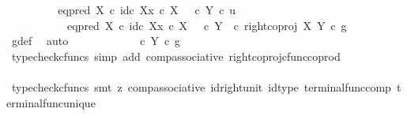\begin{isabellebody}
\ {\isacharminus}{\kern0pt}\isanewline
\ \ \ \ \ \ \isamarkupfalse%
\ {\isachardoublequoteopen}{\isacharparenleft}{\kern0pt}eq{\isacharunderscore}{\kern0pt}pred\ X\ {\isasymcirc}\isactrlsub c\ {\isasymlangle}id\isactrlsub c\ X{\isacharcomma}{\kern0pt}x\ {\isasymcirc}\isactrlsub c\ {\isasymbeta}\isactrlbsub X\isactrlesub {\isasymrangle}{\isacharparenright}{\kern0pt}\ {\isasymamalg}\ {\isacharparenleft}{\kern0pt}{\isasymf}\ {\isasymcirc}\isactrlsub c\ {\isasymbeta}\isactrlbsub Y\isactrlesub {\isacharparenright}{\kern0pt}\ {\isasymcirc}\isactrlsub c\ u\isanewline
\ \ \ \ \ \ \ \ \ \ {\isacharequal}{\kern0pt}\ {\isacharparenleft}{\kern0pt}eq{\isacharunderscore}{\kern0pt}pred\ X\ {\isasymcirc}\isactrlsub c\ {\isasymlangle}id\isactrlsub c\ X{\isacharcomma}{\kern0pt}x\ {\isasymcirc}\isactrlsub c\ {\isasymbeta}\isactrlbsub X\isactrlesub {\isasymrangle}{\isacharparenright}{\kern0pt}\ {\isasymamalg}\ {\isacharparenleft}{\kern0pt}{\isasymf}\ {\isasymcirc}\isactrlsub c\ {\isasymbeta}\isactrlbsub Y\isactrlesub {\isacharparenright}{\kern0pt}\ \ {\isasymcirc}\isactrlsub c\ right{\isacharunderscore}{\kern0pt}coproj\ X\ Y\ {\isasymcirc}\isactrlsub c\ g{\isachardoublequoteclose}\isanewline
\ \ \ \ \ \ \ \ \isamarkupfalse%
\ g{\isacharunderscore}{\kern0pt}def\ \isamarkupfalse%
\ auto\isanewline
\ \ \ \ \ \ \isamarkupfalse%
\ \isamarkupfalse%
\ {\isachardoublequoteopen}{\isachardot}{\kern0pt}{\isachardot}{\kern0pt}{\isachardot}{\kern0pt}\ {\isacharequal}{\kern0pt}\ {\isacharparenleft}{\kern0pt}{\isasymf}\ {\isasymcirc}\isactrlsub c\ {\isasymbeta}\isactrlbsub Y\isactrlesub {\isacharparenright}{\kern0pt}\ {\isasymcirc}\isactrlsub c\ g{\isachardoublequoteclose}\isanewline
\ \ \ \ \ \ \ \ \isamarkupfalse%
\ {\isacharparenleft}{\kern0pt}typecheck{\isacharunderscore}{\kern0pt}cfuncs{\isacharcomma}{\kern0pt}\ simp\ add{\isacharcolon}{\kern0pt}\ comp{\isacharunderscore}{\kern0pt}associative{}\ right{\isacharunderscore}{\kern0pt}coproj{\isacharunderscore}{\kern0pt}cfunc{\isacharunderscore}{\kern0pt}coprod{\isacharparenright}{\kern0pt}\isanewline
\ \ \ \ \ \ \isamarkupfalse%
\ \isamarkupfalse%
\ {\isachardoublequoteopen}{\isachardot}{\kern0pt}{\isachardot}{\kern0pt}{\isachardot}{\kern0pt}\ {\isacharequal}{\kern0pt}\ {\isasymf}{\isachardoublequoteclose}\isanewline
\ \ \ \ \ \ \ \ \isamarkupfalse%
\ {\isacharparenleft}{\kern0pt}typecheck{\isacharunderscore}{\kern0pt}cfuncs{\isacharcomma}{\kern0pt}\ smt\ {\isacharparenleft}{\kern0pt}z{}{\isacharparenright}{\kern0pt}\ comp{\isacharunderscore}{\kern0pt}associative{}\ id{\isacharunderscore}{\kern0pt}right{\isacharunderscore}{\kern0pt}unit{}\ id{\isacharunderscore}{\kern0pt}type\ terminal{\isacharunderscore}{\kern0pt}func{\isacharunderscore}{\kern0pt}comp\ terminal{\isacharunderscore}{\kern0pt}func{\isacharunderscore}{\kern0pt}unique{\isacharparenright}{\kern0pt}\isanewline

\end{isabellebody}
